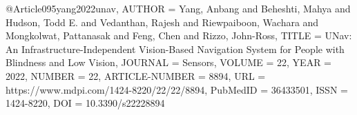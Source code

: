@Article{095yang2022unav,
AUTHOR = {Yang, Anbang and Beheshti, Mahya and Hudson, Todd E. and Vedanthan, Rajesh and Riewpaiboon, Wachara and Mongkolwat, Pattanasak and Feng, Chen and Rizzo, John-Ross},
TITLE = {UNav: An Infrastructure-Independent Vision-Based Navigation System for People with Blindness and Low Vision},
JOURNAL = {Sensors},
VOLUME = {22},
YEAR = {2022},
NUMBER = {22},
ARTICLE-NUMBER = {8894},
URL = {https://www.mdpi.com/1424-8220/22/22/8894},
PubMedID = {36433501},
ISSN = {1424-8220},
DOI = {10.3390/s22228894}
}